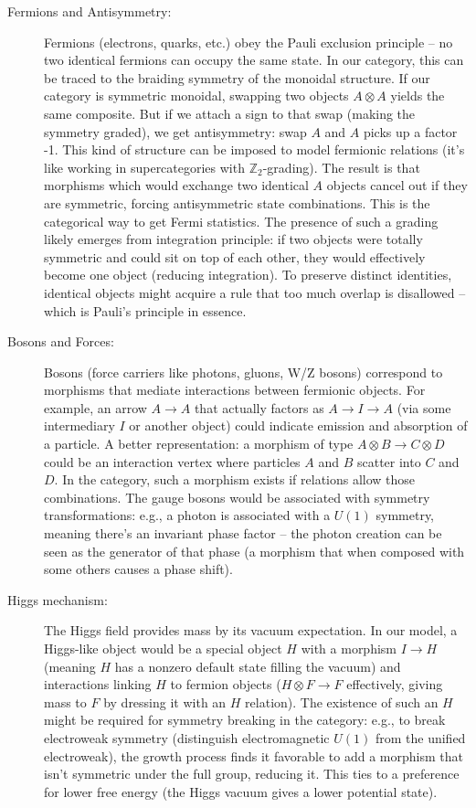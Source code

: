 \documentclass{article}
\begin{document}
\begin{description}
\item[Fermions and Antisymmetry:] Fermions (electrons, quarks, etc.) obey the Pauli exclusion principle – no two identical fermions can occupy the same state. In our category, this can be traced to the braiding symmetry of the monoidal structure. If our category is symmetric monoidal, swapping two objects $A\otimes A$ yields the same composite. But if we attach a sign to that swap (making the symmetry graded), we get antisymmetry: swap $A$ and $A$ picks up a factor -1. This kind of structure can be imposed to model fermionic relations (it’s like working in supercategories with $\mathbb{Z}_2$-grading). The result is that morphisms which would exchange two identical $A$ objects cancel out if they are symmetric, forcing antisymmetric state combinations. This is the categorical way to get Fermi statistics. The presence of such a grading likely emerges from integration principle: if two objects were totally symmetric and could sit on top of each other, they would effectively become one object (reducing integration). To preserve distinct identities, identical objects might acquire a rule that too much overlap is disallowed – which is Pauli’s principle in essence.

\item[Bosons and Forces:] Bosons (force carriers like photons, gluons, W/Z bosons) correspond to morphisms that mediate interactions between fermionic objects. For example, an arrow $A \to A$ that actually factors as $A \to I \to A$ (via some intermediary $I$ or another object) could indicate emission and absorption of a particle. A better representation: a morphism of type $A\otimes B \to C\otimes D$ could be an interaction vertex where particles $A$ and $B$ scatter into $C$ and $D$. In the category, such a morphism exists if relations allow those combinations. The gauge bosons would be associated with symmetry transformations: e.g., a photon is associated with a $U(1)$ symmetry, meaning there’s an invariant phase factor – the photon creation can be seen as the generator of that phase (a morphism that when composed with some others causes a phase shift).

\item[Higgs mechanism:] The Higgs field provides mass by its vacuum expectation. In our model, a Higgs-like object would be a special object $H$ with a morphism $I \to H$ (meaning $H$ has a nonzero default state filling the vacuum) and interactions linking $H$ to fermion objects ($H \otimes F \to F$ effectively, giving mass to $F$ by dressing it with an $H$ relation). The existence of such an $H$ might be required for symmetry breaking in the category: e.g., to break electroweak symmetry (distinguish electromagnetic $U(1)$ from the unified electroweak), the growth process finds it favorable to add a morphism that isn’t symmetric under the full group, reducing it. This ties to a preference for lower free energy (the Higgs vacuum gives a lower potential state).


\end{description}
\end{document}
